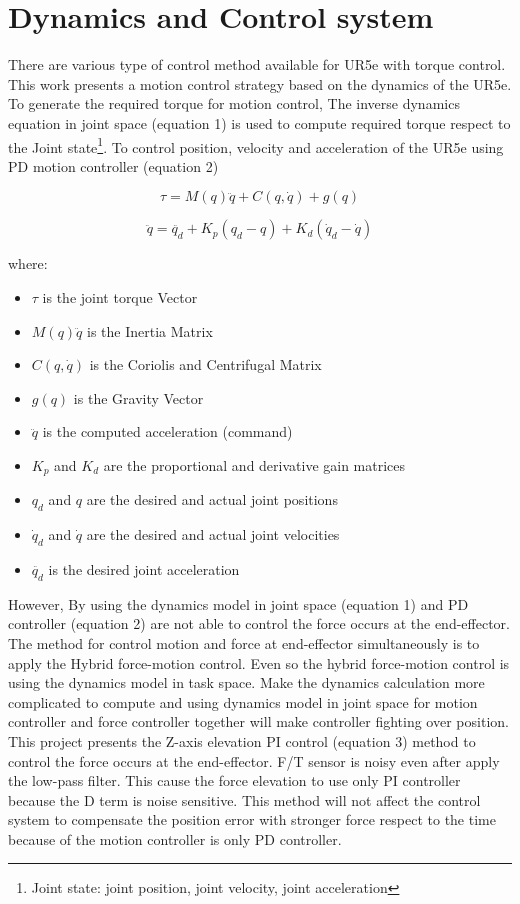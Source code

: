 \section{Dynamics and Control system}

There are various type of control method available for UR5e with torque control. This work presents a motion control strategy based on the dynamics of the UR5e. To generate the required torque for motion control, The inverse dynamics equation in joint space (equation 1) is used to compute required torque respect to the Joint state\footnote{Joint state: joint position, joint velocity, joint acceleration}. To control position, velocity and acceleration of the UR5e using PD motion controller (equation 2)

\begin{equation}
    \tau = M(q)\ddot{q} + C(q, \dot{q}) + g(q)
    \label{eq:Dynamics}
\end{equation}

\begin{equation}
    \ddot{q} = \ddot{q_d} + K_p(q_d - q) + K_d(\dot{q}_d - \dot{q})
    \label{eq:pd_control}
\end{equation}

where:
\begin{itemize}
    \item $\tau$ is the joint torque Vector
    \item $M(q)\ddot{q}$ is the Inertia Matrix
    \item $C(q, \dot{q})$ is the Coriolis and Centrifugal Matrix
    \item $g(q)$ is the Gravity Vector
    \item $\ddot{q}$ is the computed acceleration (command)
    \item $K_p$ and $K_d$ are the proportional and derivative gain matrices
    \item $q_d$ and $q$ are the desired and actual joint positions
    \item $\dot{q}_d$ and $\dot{q}$ are the desired and actual joint velocities
    \item $\ddot{q_d}$ is the desired joint acceleration
\end{itemize}

However, By using the dynamics model in joint space (equation 1) and PD controller (equation 2) are not able to control the force occurs at the end-effector. The method for control motion and force at end-effector simultaneously is to apply the Hybrid force-motion control. Even so the hybrid force-motion control is using the dynamics model in task space. Make the dynamics calculation more complicated to compute and using dynamics model in joint space for motion controller and force controller together will make controller fighting over position. This project presents the Z-axis elevation PI control (equation 3) method to control the force occurs at the end-effector. F/T sensor is noisy even after apply the low-pass filter. This cause the force elevation to use only PI controller because the D term is noise sensitive. This method will not affect the control system to compensate the position error with stronger force respect to the time because of the motion controller is only PD controller. 


